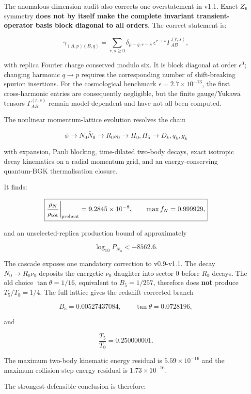 \documentclass[
  10pt,
]{article}
\begin{document}
The anomalous-dimension audit also corrects one overstatement in v1.1.
Exact \(Z_6\) symmetry \textbf{does not by itself make the complete
invariant transient-operator basis block diagonal to all orders}. The
correct statement is:

\[
\boxed{
\gamma_{(A,p)(B,q)}
=
\sum_{r,s\ge0}
\delta_{p-q,r-s}\,
\epsilon^{r+s}
\Gamma_{AB}^{(r,s)},
}
\]

with replica Fourier charge conserved modulo six. It is block diagonal
at order \(\epsilon^0\); changing harmonic \(q\to p\) requires the
corresponding number of shift-breaking spurion insertions. For the
cosmological benchmark \(\epsilon=2.7\times10^{-13}\), the first
cross-harmonic entries are consequently negligible, but the finite
gauge/Yukawa tensors \(\Gamma_{AB}^{(r,s)}\) remain model-dependent and
have not all been computed.

The nonlinear momentum-lattice evolution resolves the chain

\[
\phi
\longrightarrow
N_0\bar N_0
\longrightarrow
R_0\nu_0
\longrightarrow
H_0,H_5
\longrightarrow
D_k,q_k,g_k
\]

with expansion, Pauli blocking, time-dilated two-body decays, exact
isotropic decay kinematics on a radial momentum grid, and an
energy-conserving quantum-BGK thermalisation closure.

It finds:

\[
\boxed{
\frac{\rho_N}{\rho_{\rm tot}}\bigg|_{\rm preheat}
=9.2845\times10^{-8},
\qquad
\max f_N=0.999929,
}
\]

and an unselected-replica production bound of approximately

\[
\log_{10}P_{N_h}<-8562.6.
\]

The cascade exposes one mandatory correction to v0.9-v1.1. The decay
\(N_0\to R_0\nu_0\) deposits the energetic \(\nu_0\) daughter into
sector 0 before \(R_0\) decays. The old choice \(\tan\theta=1/16\),
equivalent to \(B_5=1/257\), therefore does \textbf{not} produce
\(T_5/T_0=1/4\). The full lattice gives the redshift-corrected branch

\[
\boxed{
B_5=0.00527437084,
\qquad
\tan\theta=0.0728196,
}
\]

and

\[
\boxed{
\frac{T_5}{T_0}=0.250000001.
}
\]

The maximum two-body kinematic energy residual is \(5.59\times10^{-16}\)
and the maximum collision-step energy residual is
\(1.73\times10^{-16}\).

The strongest defensible conclusion is therefore:
\end{document}
